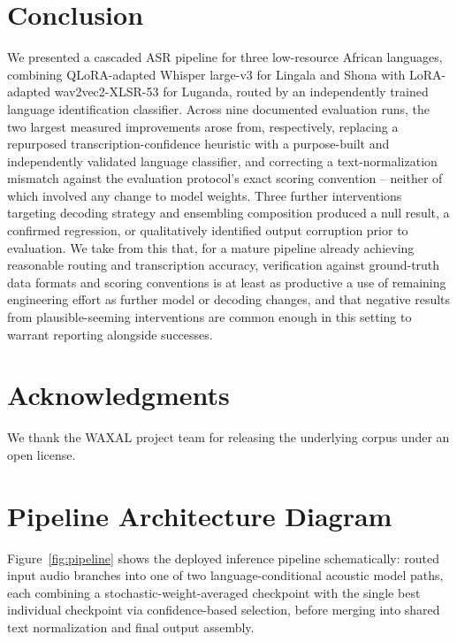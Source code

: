 \documentclass[11pt]{article}
\begin{document}
\section{Conclusion}

We presented a cascaded ASR pipeline for three low-resource African languages, combining QLoRA-adapted Whisper large-v3 for Lingala and Shona with LoRA-adapted wav2vec2-XLSR-53 for Luganda, routed by an independently trained language identification classifier. Across nine documented evaluation runs, the two largest measured improvements arose from, respectively, replacing a repurposed transcription-confidence heuristic with a purpose-built and independently validated language classifier, and correcting a text-normalization mismatch against the evaluation protocol's exact scoring convention -- neither of which involved any change to model weights. Three further interventions targeting decoding strategy and ensembling composition produced a null result, a confirmed regression, or qualitatively identified output corruption prior to evaluation. We take from this that, for a mature pipeline already achieving reasonable routing and transcription accuracy, verification against ground-truth data formats and scoring conventions is at least as productive a use of remaining engineering effort as further model or decoding changes, and that negative results from plausible-seeming interventions are common enough in this setting to warrant reporting alongside successes.

\section*{Acknowledgments}
We thank the WAXAL project team for releasing the underlying corpus under an open license.




\clearpage
\appendix
\section{Pipeline Architecture Diagram}

Figure~\ref{fig:pipeline} shows the deployed inference pipeline schematically: routed input audio branches into one of two language-conditional acoustic model paths, each combining a stochastic-weight-averaged checkpoint with the single best individual checkpoint via confidence-based selection, before merging into shared text normalization and final output assembly.
\end{document}
